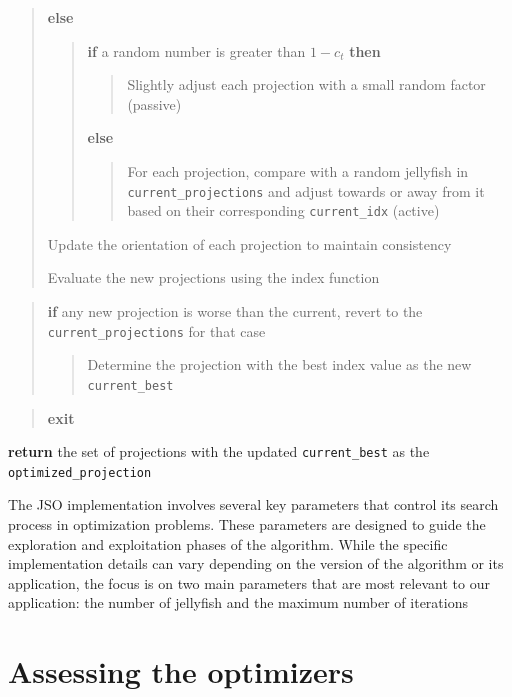 \documentclass[
  12pt,
]{interact}
\theoremstyle{plain}
\begin{document}
\begin{tcolorbox}
\begin{quote}
\textbf{else}

\begin{quote}
\textbf{if} a random number is greater than \(1 - c_t\) \textbf{then}

\begin{quote}
Slightly adjust each projection with a small random factor (passive)
\end{quote}

\textbf{else}

\begin{quote}
For each projection, compare with a random jellyfish in
\texttt{current\_projections} and adjust towards or away from it based
on their corresponding \texttt{current\_idx} (active)
\end{quote}
\end{quote}

Update the orientation of each projection to maintain consistency

Evaluate the new projections using the index function
\end{quote}

\begin{quote}
\textbf{if} any new projection is worse than the current, revert to the
\texttt{current\_projections} for that case

\begin{quote}
Determine the projection with the best index value as the new
\texttt{current\_best}
\end{quote}
\end{quote}

\begin{quote}
\textbf{exit}
\end{quote}

\textbf{return} the set of projections with the updated
\texttt{current\_best} as the \texttt{optimized\_projection}

\end{tcolorbox}

The JSO implementation involves several key parameters that control its
search process in optimization problems. These parameters are designed
to guide the exploration and exploitation phases of the algorithm. While
the specific implementation details can vary depending on the version of
the algorithm or its application, the focus is on two main parameters
that are most relevant to our application: the number of jellyfish and
the maximum number of iterations

\section{Assessing the optimizers}\label{sec-sim-deets}
\end{document}
